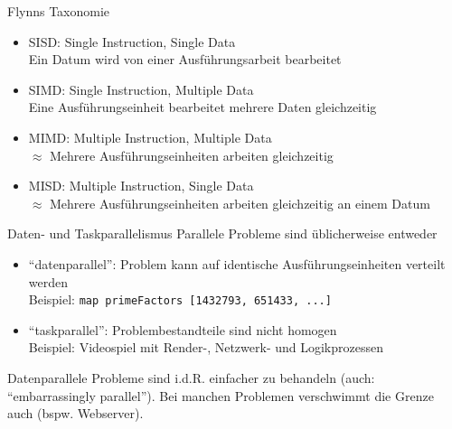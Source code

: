 \documentclass{beamer}
\begin{document}
\begin{frame}{Flynns Taxonomie}
	\begin{itemize}
		\item SISD: Single Instruction, Single Data\\
			{\footnotesize Ein Datum wird von einer Ausführungsarbeit bearbeitet}
		\item SIMD: Single Instruction, Multiple Data\\
			{\footnotesize Eine Ausführungseinheit bearbeitet mehrere Daten gleichzeitig}
		\item MIMD: Multiple Instruction, Multiple Data\\
			{\footnotesize $\approx$ Mehrere Ausführungseinheiten arbeiten gleichzeitig}
		\item MISD: Multiple Instruction, Single Data\\
			{\footnotesize $\approx$ Mehrere Ausführungseinheiten arbeiten gleichzeitig an einem Datum}
	\end{itemize}
\end{frame}

\begin{frame}{Daten- und Taskparallelismus}
	Parallele Probleme sind üblicherweise entweder
	
	\begin{itemize}
		\item \enquote{datenparallel}: Problem kann auf identische Ausführungseinheiten verteilt werden\\
			Beispiel: \texttt{map primeFactors [1432793, 651433, ...]}

		\item \enquote{taskparallel}: Problembestandteile sind nicht homogen\\
			Beispiel: Videospiel mit Render-, Netzwerk- und Logikprozessen
	\end{itemize}

	Datenparallele Probleme sind i.d.R. einfacher zu behandeln (auch: \enquote{embarrassingly parallel}).
	Bei manchen Problemen verschwimmt die Grenze auch (bspw. Webserver).
\end{frame}
\end{document}
